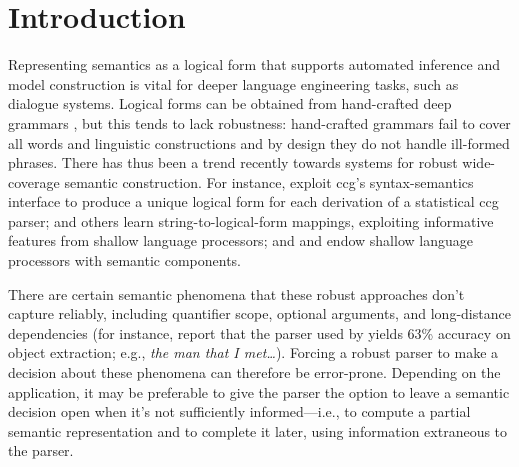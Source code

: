 
\section{Introduction} \label{sec:intro}

Representing semantics as a logical form that supports automated
inference and model construction is vital for deeper language
engineering tasks, such as dialogue systems.  Logical forms
can be obtained from hand-crafted deep grammars
\cite{butt:etal:1999,copestake:flickinger:2000}, but this
tends to lack robustness: hand-crafted grammars fail to cover all
words and linguistic constructions and by design they do not handle
ill-formed phrases. 
There has thus been a trend recently towards systems for
robust wide-coverage semantic construction.  For instance,
 exploit {\sc ccg}'s syntax-semantics
interface to produce a unique logical form for each derivation of a
statistical {\sc ccg} parser;  and
others learn string-to-logical-form mappings, exploiting informative
features from shallow language processors; and
 and  endow shallow
language processors with semantic components.

% 

There are certain semantic phenomena that these robust
approaches don't capture reliably, including quantifier scope,
optional arguments, and long-distance dependencies (for instance,
 report that the parser used by
 yields 63\% accuracy on object
extraction; e.g., {\em the man that I met\dots}).  Forcing a robust
parser to make a decision about these phenomena can therefore be
error-prone.  Depending on the application, it may be preferable to
give the parser the option to leave a semantic decision open when it's not
sufficiently informed---i.e., to compute a partial semantic
representation and to complete it later, using information
extraneous to the parser.

